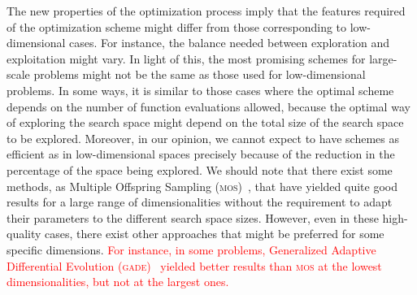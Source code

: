\documentclass[preprint,3p]{elsarticle}
\begin{document}
The new properties of the optimization process imply that the features required of the optimization scheme
might differ from those corresponding to low-dimensional cases.
%
For instance, the balance needed between exploration and exploitation might vary.
%
In light of this, the most promising schemes for large-scale problems might not be the same
as those used for low-dimensional problems.
%
In some ways, it is similar to those cases where the optimal scheme depends on the number of function evaluations allowed,
because the optimal way of exploring the search space might depend on the total size of the search space to be explored.
%
Moreover, in our opinion, we cannot expect to have schemes as efficient as in low-dimensional spaces precisely because of the
reduction in the percentage of the space being explored.
%
 We should note that there exist some methods, as Multiple Offspring Sampling (\textsc{mos})~\cite{LaTorre:11}, that have yielded quite good results for a large range of dimensionalities without
the requirement to adapt their parameters to the different search space sizes.
%
However, even in these high-quality cases, there exist other approaches that might be preferred for some specific dimensions.
%
\textcolor{red}{
For instance, in some problems, Generalized Adaptive Differential Evolution (\textsc{gade})~\cite{Yang:11} yielded better results than \textsc{mos} at the lowest dimensionalities,
but not at the largest ones.
}
%
%
\end{document}
